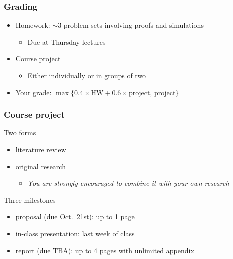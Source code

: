 \documentclass[compress,
mathserif,wide,%
]{beamer}
\begin{document}
\begin{frame}
\frametitle{Grading}


\begin{itemize}
\itemsep3em

\item Homework: ${\sim}$3 problem sets involving proofs and simulations
\smallskip
\begin{itemize}
  \itemsep0.3em
  \item Due at Thursday lectures
\end{itemize}



\item Course project 
\begin{itemize}
  \item Either individually or in groups of two
\end{itemize}


\item Your grade: $\max\{ 0.4\times \text{HW} + 0.6\times \text{project},\, \text{project} \}$ 

\end{itemize}


\end{frame}


\begin{frame}
\frametitle{Course project}

Two forms
\begin{itemize}
\itemsep0.5em
\item literature review
\item original research
\begin{itemize}
  \item \alert{\em You are strongly encouraged to combine it with your own research}
\end{itemize}
\end{itemize}

\pause
\vfill

Three milestones

\begin{itemize}
\itemsep0.5em
\item proposal (due Oct.~21st): up to 1 page
\item in-class presentation: last week of class
\item report (due TBA): up to 4 pages with unlimited appendix
\end{itemize}


\end{frame}
\end{document}

